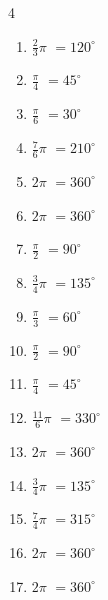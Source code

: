 \begin{multicols}{4}
\begin{enumerate}
  \item $\displaystyle \frac{2}{3}\pi$
        $\displaystyle =120^{\circ}$

  \item $\displaystyle \frac{\pi}{4}$
        $\displaystyle =45^{\circ}$

  \item $\displaystyle \frac{\pi}{6}$
        $\displaystyle =30^{\circ}$

  \item $\displaystyle \frac{7}{6}\pi$
        $\displaystyle =210^{\circ}$

  \item $\displaystyle 2\pi$
        $\displaystyle =360^{\circ}$

  \item $\displaystyle 2\pi$
        $\displaystyle =360^{\circ}$

  \item $\displaystyle \frac{\pi}{2}$
        $\displaystyle =90^{\circ}$

  \item $\displaystyle \frac{3}{4}\pi$
        $\displaystyle =135^{\circ}$

\columnbreak %

  \item $\displaystyle \frac{\pi}{3}$
        $\displaystyle =60^{\circ}$

  \item $\displaystyle \frac{\pi}{2}$
        $\displaystyle =90^{\circ}$

  \item $\displaystyle \frac{\pi}{4}$
        $\displaystyle =45^{\circ}$

  \item $\displaystyle \frac{11}{6}\pi$
        $\displaystyle =330^{\circ}$

  \item $\displaystyle 2\pi$
        $\displaystyle =360^{\circ}$

  \item $\displaystyle \frac{3}{4}\pi$
        $\displaystyle =135^{\circ}$

  \item $\displaystyle \frac{7}{4}\pi$
        $\displaystyle =315^{\circ}$

  \item $\displaystyle 2\pi$
        $\displaystyle =360^{\circ}$

  \item $\displaystyle 2\pi$
        $\displaystyle =360^{\circ}$


\end{enumerate}
\end{multicols}
